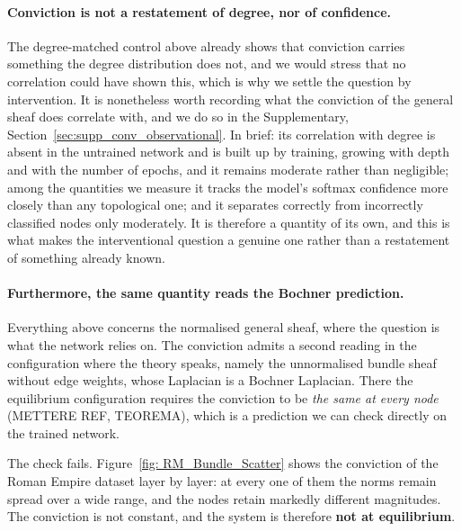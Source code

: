 

\paragraph{Conviction is not a restatement of degree, nor of confidence.}
The degree-matched control above already shows that conviction carries something
the degree distribution does not, and we would stress that no correlation could
have shown this, which is why we settle the question by intervention. It is
nonetheless worth recording what the conviction of the general sheaf does
correlate with, and we do so in the Supplementary,
Section~\ref{sec:supp_conv_observational}. In brief: its correlation with degree
is absent in the untrained network and is built up by training, growing with
depth and with the number of epochs, and it remains moderate rather than
negligible; among the quantities we measure it tracks the model's softmax
confidence more closely than any topological one; and it separates correctly
from incorrectly classified nodes only moderately. It is therefore a quantity of
its own, and this is what makes the interventional question a genuine one rather
than a restatement of something already known.

\paragraph{Furthermore, the same quantity reads the Bochner prediction.}
Everything above concerns the normalised general sheaf, where the question is
what the network relies on. The conviction admits a second reading in the
configuration where the theory speaks, namely the unnormalised bundle sheaf
without edge weights, whose Laplacian is a Bochner Laplacian. There the
equilibrium configuration requires the conviction to be \emph{the same at every
node} (METTERE REF, TEOREMA), which is a prediction we can check directly on the
trained network.

The check fails. Figure~\ref{fig: RM_Bundle_Scatter} shows the conviction of the
Roman Empire dataset layer by layer: at every one of them the norms remain
spread over a wide range, and the nodes retain markedly different magnitudes.
The conviction is not constant, and the system is therefore \textbf{not at
equilibrium}.

